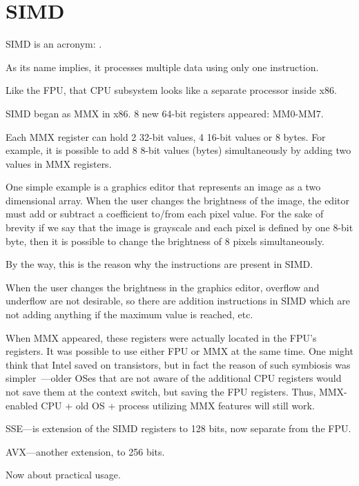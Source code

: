\chapter{SIMD}

\label{SIMD_x86}
\ac{SIMD} is an acronym: .

As its name implies, it processes multiple data using only one instruction.

Like the \ac{FPU}, that \ac{CPU} subsystem looks like a separate processor inside x86.


SIMD began as MMX in x86. 8 new 64-bit registers appeared: MM0-MM7.

Each MMX register can hold 2 32-bit values, 4 16-bit values or 8 bytes.
For example, it is possible to add 8 8-bit values (bytes) simultaneously by adding two values in MMX registers.

One simple example is a graphics editor that represents an image as a two dimensional array.
When the user changes the brightness of the image, the editor must add or subtract a coefficient to/from each pixel value.
For the sake of brevity if we say that the image is grayscale and each pixel is defined by one 8-bit byte, then it is possible
to change the brightness of 8 pixels simultaneously.

By the way, this is the reason why the  instructions are present in SIMD.

When the user changes the brightness in the graphics editor, overflow and underflow are not desirable, 
so there are addition instructions in SIMD which are not adding anything if the maximum value is reached, etc.

When MMX appeared, these registers were actually located in the FPU's registers. 
It was possible to use either FPU or MMX at the same time. One might think that Intel saved on transistors,
but in fact the reason of such symbiosis was simpler~---older \ac{OS}es that are not aware 
of the additional CPU registers would not save them at the context switch, 
but saving the FPU registers.
Thus, MMX-enabled CPU + old \ac{OS} + process utilizing MMX features will still work.

SSE---is extension of the SIMD registers to 128 bits, now separate from the FPU.

AVX---another extension, to 256 bits.

Now about practical usage.


